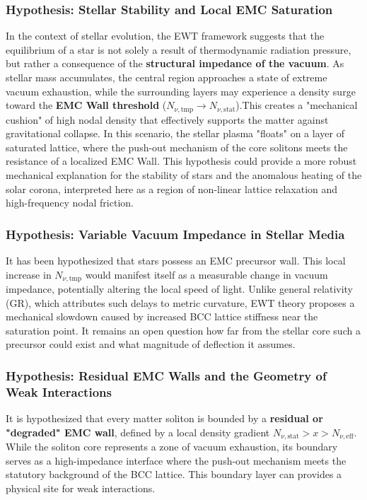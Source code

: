 \documentclass[10pt,a4paper]{article}
\begin{document}
\subsubsection*{Hypothesis: Stellar Stability and Local EMC Saturation}In the context of stellar evolution, the EWT framework suggests that the equilibrium of a star is not solely a result of thermodynamic radiation pressure, but rather a consequence of the \textbf{structural impedance of the vacuum}. As stellar mass accumulates, the central region approaches a state of extreme vacuum exhaustion, while the surrounding layers may experience a density surge toward the \textbf{EMC Wall threshold} ($N_{\nu, \text{tmp}} \to N_{\nu, \text{stat}}$).This creates a "mechanical cushion" of high nodal density that effectively supports the matter against gravitational collapse. In this scenario, the stellar plasma "floats" on a layer of saturated lattice, where the push-out mechanism of the core solitons meets the resistance of a localized EMC Wall. This hypothesis could provide a more robust mechanical explanation for the stability of stars and the anomalous heating of the solar corona, interpreted here as a region of non-linear lattice relaxation and high-frequency nodal friction.

\subsubsection*{Hypothesis: Variable Vacuum Impedance in Stellar Media}
It has been hypothesized that stars possess an EMC precursor wall. This local increase in $N_{\nu, \text{tmp}}$ would manifest itself as a measurable change in vacuum impedance, potentially altering the local speed of light. Unlike general relativity (GR), which attributes such delays to metric curvature, EWT theory proposes a mechanical slowdown caused by increased BCC lattice stiffness near the saturation point. It remains an open question how far from the stellar core such a precursor could exist and what magnitude of deflection it assumes.

\subsubsection*{Hypothesis: Residual EMC Walls and the Geometry of Weak Interactions}
It is hypothesized that every matter soliton is bounded by a \textbf{residual or "degraded" EMC wall}, defined by a local density gradient $N_{\nu, \text{stat}} > x > N_{\nu, \text{eff}}$. While the soliton core represents a zone of vacuum exhaustion, its boundary serves as a high-impedance interface where the push-out mechanism meets the statutory background of the BCC lattice. This boundary layer can provides a physical site for weak interactions.
\end{document}
